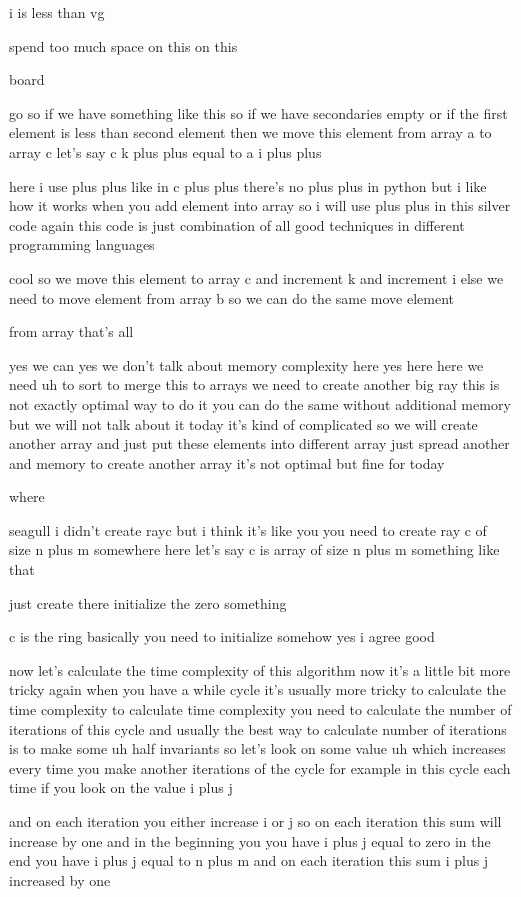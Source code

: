 i is less than vg

spend too much space on this on this

board

go so if we have something like this so if we have secondaries empty or if the first element is less than second element then we move this element from array a to array c let's say c k plus plus equal to a i plus plus

here i use plus plus like in c plus plus there's no plus plus in python but i like how it works when you add element into array so i will use plus plus in this silver code again this code is just combination of all good techniques in different programming languages

cool so we move this element to array c and increment k and increment i else we need to move element from array b so we can do the same move element

from array that's all

yes we can yes we don't talk about memory complexity here yes here here we need uh to sort to merge this to arrays we need to create another big ray this is not exactly optimal way to do it you can do the same without additional memory but we will not talk about it today it's kind of complicated so we will create another array and just put these elements into different array just spread another and memory to create another array it's not optimal but fine for today

where

seagull i didn't create rayc but i think it's like you you need to create ray c of size n plus m somewhere here let's say c is array of size n plus m something like that

just create there initialize the zero something

c is the ring basically you need to initialize somehow yes i agree good

now let's calculate the time complexity of this algorithm now it's a little bit more tricky again when you have a while cycle it's usually more tricky to calculate the time complexity to calculate time complexity you need to calculate the number of iterations of this cycle and usually the best way to calculate number of iterations is to make some uh half invariants so let's look on some value uh which increases every time you make another iterations of the cycle for example in this cycle each time if you look on the value i plus j

and on each iteration you either increase i or j so on each iteration this sum will increase by one and in the beginning you you have i plus j equal to zero in the end you have i plus j equal to n plus m and on each iteration this sum i plus j increased by one

